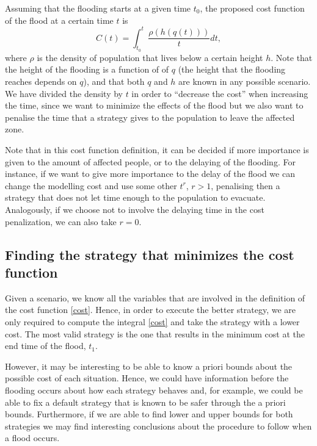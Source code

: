 Assuming that the flooding starts at a given time $t_0$, the proposed cost function of the flood at a certain time $t$ is
\begin{equation}
C(t)=\int_{t_0}^{t}\frac{\rho(h(q(t)))}{t}dt,
\label{cost}
\end{equation}
where $\rho$ is the density of population that lives below a certain height $h$. Note that the height of the flooding is a function of of $q$ (the height  that the flooding reaches depends on $q$), and that both $q$ and $h$ are known in any possible scenario. We have divided the density by $t$ in order to ``decrease the cost'' when increasing the time, since we want to minimize the effects of the flood but we also want to penalise the time that a strategy  gives to the population to leave the affected zone. 

Note that in this cost function definition, it can be decided if more importance is given to the amount of affected people, or to the delaying of the flooding. For instance, if we want to give more importance to the delay of the flood we can change the modelling cost and use some other $t^r$, $r>1$, penalising then a strategy that does not let time enough to the population to evacuate. Analogously, if we choose not to involve the delaying time in the cost penalization, we can also take $r=0$.

\subsection{Finding the strategy that minimizes the cost function}
Given a scenario, we know all the variables that are involved in the definition of the cost function \eqref{cost}. Hence, in order to execute the better strategy, we are only required to compute the integral \eqref{cost} and take the strategy with a lower cost.
 The most valid strategy is the one that results in the minimum cost at the end time of the flood, $t_1$.
 
 However, it may be interesting to be able to know a priori bounds about the possible cost of each situation. Hence, we could have information before the flooding occurs about how each strategy behaves and, for example, we could be able to fix a default strategy that is known to be safer through the a priori bounds. Furthermore, if we are able to find lower and upper bounds for both strategies we may find interesting conclusions about the procedure to follow when a flood occurs.

